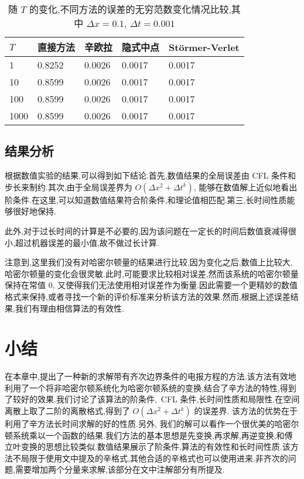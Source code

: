\begin{table}[h]
  \centering
\caption{随 $T$ 的变化,不同方法的误差的无穷范数变化情况比较,其中 $\Delta x=0.1$, $\Delta t=0.001$}
\begin{tabularx}{\linewidth}{XXXXX}
 \toprule[1.5pt]
 $T$ &直接方法 & 辛欧拉 & 隐式中点 & St\"{o}rmer-Verlet\\
 \midrule[1pt]
 1 & 0.8252 & 0.0026 & 0.0017 & 0.0017 \\
 10 & 0.8599 & 0.0026 & 0.0017 & 0.0017 \\
 100 & 0.8599 & 0.0026 & 0.0017 & 0.0017 \\
 1000 & 0.8599 & 0.0026 & 0.0017 & 0.0017 \\
 \bottomrule[1.5pt]
\end{tabularx}
  \label{tab:t3}
\end{table}

\subsection{结果分析}

根据数值实验的结果,可以得到如下结论.首先,数值结果的全局误差由 CFL 条件和步长来制约.其次,由于全局误差界为 $O(\Delta x^2+ \Delta t^k)$, 能够在数值解上近似地看出阶条件.在这里,可以知道数值结果符合阶条件,和理论值相匹配.第三,长时间性质能够很好地保持.

此外,对于过长时间的计算是不必要的,因为该问题在一定长的时间后数值衰减得很小,超过机器误差的最小值,故不做过长计算.

\begin{remark}
{\rm 注意到,这里我们没有对哈密尔顿量的结果进行比较,因为变化之后,数值上比较大,哈密尔顿量的变化会很灵敏.此时,可能要求比较相对误差,然而该系统的哈密尔顿量保持在常值 $0$, 又使得我们无法使用相对误差作为衡量.因此需要一个更精妙的数值格式来保持,或者寻找一个新的评价标准来分析该方法的效果.然而,根据上述误差结果,我们有理由相信算法的有效性.}
\end{remark}

\section{小结}\label{sec:02conclusion}
在本章中,提出了一种新的求解带有齐次边界条件的电报方程的方法.该方法有效地利用了一个将非哈密尔顿系统化为哈密尔顿系统的变换,结合了辛方法的特性,得到了较好的效果.我们讨论了该算法的阶条件,~CFL 条件,长时间性质和局限性.在空间离散上取了二阶的离散格式,得到了 $O(\Delta x^2+ \Delta
t^k)$ 的误差界. 该方法的优势在于利用了辛方法长时间求解的好的性质.另外, 我们的解可以看作一个很优美的哈密尔顿系统乘以一个函数的结果.我们方法的基本思想是先变换,再求解,再逆变换,和傅立叶变换的思想比较类似.数值结果展示了阶条件,算法的有效性和长时间性质.该方法不局限于使用文中提及的辛格式,其他合适的辛格式也可以使用进来.非齐次的问题,需要增加两个分量来求解,该部分在文中注解部分有所提及.

